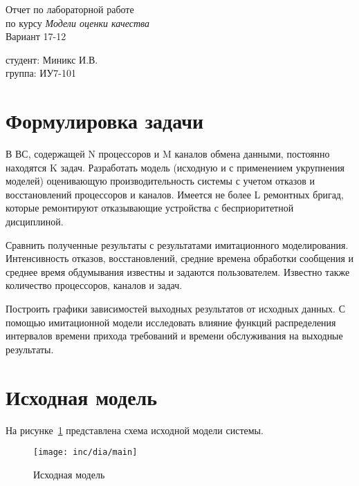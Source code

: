 \documentclass[utf8x, 12pt]{G7-32} %
\begin{document}
\frontmatter %


\nobreakingbeforechapters


\begin{center}
Отчет по лабораторной работе \\ по курсу \textit{Модели оценки качества} \\ Вариант 17-12 
\end{center}
\begin{flushright}
студент: Миникс И.В.\\ группа: ИУ7-101
\end{flushright}

\section{Формулировка задачи}

В ВС, содержащей N процессоров и M каналов обмена данными, постоянно находятся K задач. Разработать модель (исходную и с применением укрупнения моделей) оценивающую производительность системы с учетом отказов и восстановлений процессоров и каналов. Имеется не более L ремонтных бригад, которые ремонтируют отказывающие устройства с бесприоритетной дисциплиной. 

Сравнить полученные результаты с результатами имитационного моделирования. Интенсивность отказов, восстановлений, средние времена обработки сообщения и среднее время обдумывания известны и задаются пользователем. Известно также количество процессоров, каналов и задач.

Построить графики зависимостей выходных результатов от исходных данных. С помощью имитационной модели исследовать влияние функций распределения интервалов времени прихода требований и времени обслуживания на выходные результаты.


\section {Исходная модель}
На рисунке~\ref{fig:main} представлена схема исходной модели системы.
\begin{figure}[ht]
\centering
\texttt{[image: inc/dia/main]}
\caption{Исходная модель}
\label{fig:main}
\end{figure}
\end{document}
